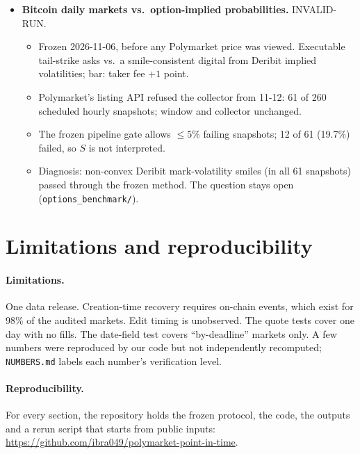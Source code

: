 \documentclass[10pt]{article}
\newcommand{\code}[1]{\texttt{#1}}
\begin{document}
\begin{itemize}
\begin{itemize}[nosep]
            point estimate nets $+0.18$\textcent\ per \$ at the worst-case fee
            and its CI lower end nets $-0.16$\textcent. That is not evidence of a
            tradable edge.
      \item This is a screen on published numbers, not a new estimate
            (\texttt{negative\_results/fee\_screen/}).
    \end{itemize}
  \item \textbf{Bitcoin daily markets vs.\ option-implied probabilities.}
        INVALID-RUN.
        \begin{itemize}[nosep]
          \item Frozen 2026-11-06, before any Polymarket price was viewed.
                Executable tail-strike asks vs.\ a smile-consistent digital from
                Deribit implied volatilities; bar: taker fee $+1$ point.
          \item Polymarket's listing API refused the collector from 11-12: 61 of
                260 scheduled hourly snapshots; window and collector unchanged.
          \item The frozen pipeline gate allows $\leq 5\%$ failing snapshots;
                12 of 61 (19.7\%) failed, so $S$ is not interpreted.
          \item Diagnosis: non-convex Deribit mark-volatility smiles (in all 61
                snapshots) passed through the frozen method. The question stays
                open (\texttt{options\_benchmark/}).
        \end{itemize}
\end{itemize}

\section{Limitations and reproducibility}

\paragraph{Limitations.} One data release. Creation-time recovery requires
on-chain events, which exist for 98\% of the audited markets. Edit timing is
unobserved. The quote tests cover one day with no fills. The date-field test
covers ``by-deadline'' markets only. A few numbers were reproduced by our code
but not independently recomputed; \code{NUMBERS.md} labels each number's
verification level.

\paragraph{Reproducibility.} For every section, the repository holds the frozen
protocol, the code, the outputs and a rerun script that starts from public
inputs: \url{https://github.com/ibra049/polymarket-point-in-time}.
\end{document}
